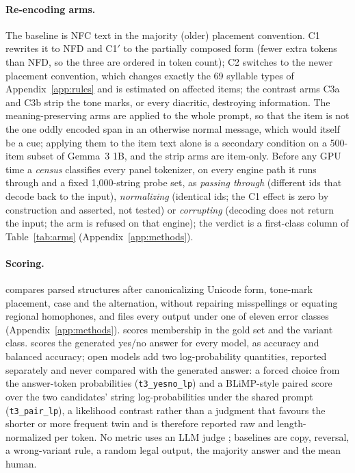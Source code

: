 \paragraph{Re-encoding arms.}
The baseline is NFC text in the majority (older) placement convention. C1 rewrites it to NFD and C1$'$ to the partially composed form (fewer extra tokens than NFD, so the three are ordered in token count); C2 switches to the newer placement convention, which changes exactly the 69 syllable types of Appendix~\ref{app:rules} and is estimated on affected items; the contrast arms C3a and C3b strip the tone marks, or every diacritic, destroying information. The meaning-preserving arms are applied to the whole prompt, so that the item is not the one oddly encoded span in an otherwise normal message, which would itself be a cue; applying them to the item text alone is a secondary condition on a 500-item subset of Gemma~3 1B, and the strip arms are item-only. Before any GPU time a \emph{census} classifies every panel tokenizer, on every engine path it runs through and a fixed 1,000-string probe set, as \emph{passing through} (different ids that decode back to the input), \emph{normalizing} (identical ids; the C1 effect is zero by construction and asserted, not tested) or \emph{corrupting} (decoding does not return the input; the arm is refused on that engine); the verdict is a first-class column of Table~\ref{tab:arms} (Appendix~\ref{app:methods}).

\paragraph{Scoring.}
 compares parsed structures after canonicalizing Unicode form, tone-mark placement, case and the  alternation, without repairing misspellings or equating regional homophones, and files every output under one of eleven error classes (Appendix~\ref{app:methods}).  scores membership in the gold set and the variant class.  scores the generated yes/no answer for every model, as accuracy and balanced accuracy; open models add two log-probability quantities, reported separately and never compared with the generated answer: a forced choice from the answer-token probabilities (\texttt{t3\_yesno\_lp}) and a BLiMP-style paired score over the two candidates' string log-probabilities under the shared  prompt (\texttt{t3\_pair\_lp}), a likelihood contrast rather than a judgment \citep{2023-acl-long-230,2023-emnlp-main-306} that favours the shorter or more frequent twin and is therefore reported raw and length-normalized per token. No metric uses an LLM judge \citep{2025-findings-emnlp-587}; baselines are copy, reversal, a wrong-variant rule, a random legal output, the majority  answer and the mean human.

